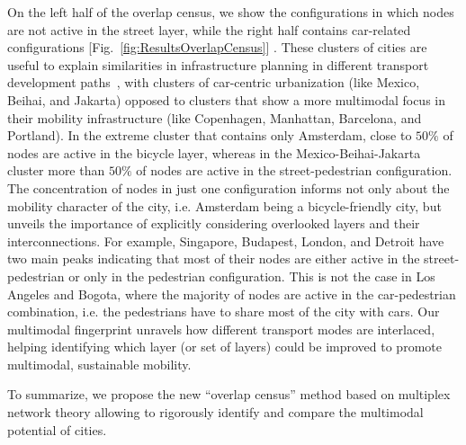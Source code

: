On the left half of the overlap census, we show the configurations in which nodes are not active in the street layer, while the right half contains car-related configurations [Fig.~\ref{fig:ResultsOverlapCensus}] . These clusters of cities are useful to explain similarities in infrastructure planning in different transport development paths~\cite{Rodrigue2013Geography,louf2014typology}, with clusters of car-centric urbanization (like Mexico, Beihai, and Jakarta) opposed to clusters that show a more multimodal focus in their mobility infrastructure (like Copenhagen, Manhattan, Barcelona, and Portland). In the extreme cluster that contains only Amsterdam, close to $50\%$ of nodes are active in the bicycle layer, whereas in the Mexico-Beihai-Jakarta cluster more than $50\%$ of nodes are active in the street-pedestrian configuration. The concentration of nodes in just one configuration informs not only about the mobility character of the city, i.e. Amsterdam being a bicycle-friendly city, but unveils the importance of explicitly considering overlooked layers and their interconnections. For example, Singapore, Budapest, London, and Detroit have two main peaks indicating that most of their nodes are either active in the street-pedestrian or only in the pedestrian configuration. This is not the case in Los Angeles and Bogota, where the majority of nodes are active in the car-pedestrian combination, i.e. the pedestrians have to share most of the city with cars. Our multimodal fingerprint unravels how different transport modes are interlaced, helping identifying which layer (or set of layers) could be improved to promote multimodal, sustainable mobility.

To summarize, we propose the new ``overlap census'' method based on multiplex network theory allowing to rigorously identify and compare the multimodal potential of cities.
